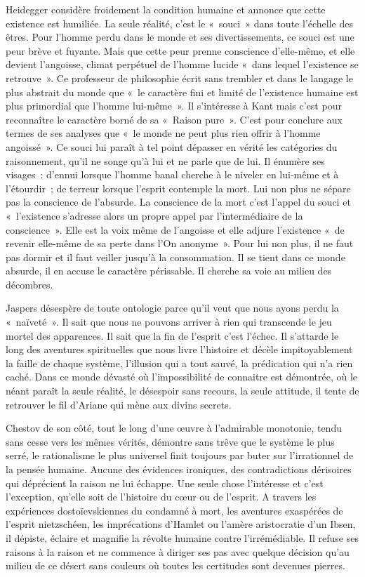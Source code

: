 \documentclass{book}
\begin{document}
Heidegger considère froidement la condition humaine et annonce que cette existence est humiliée. La seule réalité, c'est le « souci » dans toute l'échelle des êtres. Pour l'homme perdu dans le monde et ses divertissements, ce souci est une peur brève et fuyante. Mais que cette peur prenne conscience d'elle-même, et elle devient l'angoisse, climat perpétuel de l'homme lucide « dans lequel l'existence se retrouve ». Ce professeur de philosophie écrit sans trembler et dans le langage le plus abstrait du monde que « le caractère fini et limité de l'existence humaine est plus primordial que l'homme lui-même ». Il s'intéresse à Kant mais c'est pour reconnaître le caractère borné de sa « Raison pure ». C'est pour conclure aux termes de ses analyses que « le monde ne peut plus rien offrir à l'homme angoissé ». Ce souci lui paraît à tel point dépasser en vérité les catégories du raisonnement, qu'il ne songe qu'à lui et ne parle que de lui. Il énumère ses visages : d'ennui lorsque l'homme banal cherche à le niveler en lui‑même et à l'étourdir ; de terreur lorsque l'esprit contemple la mort. Lui non plus ne sépare pas la conscience de l'absurde. La conscience de la mort c'est l'appel du souci et « l'existence s'adresse alors un propre appel par l'intermédiaire de la conscience ». Elle est la voix même de l'angoisse et elle adjure l'existence « de revenir elle-même de sa perte dans l'On anonyme ». Pour lui non plus, il ne faut pas dormir et il faut veiller jusqu'à la consommation. Il se tient dans ce monde absurde, il en accuse le caractère périssable. Il cherche sa voie au milieu des décombres.

Jaspers désespère de toute ontologie parce qu'il veut que nous ayons perdu la « naïveté ». Il sait que nous ne pouvons arriver à rien qui transcende le jeu mortel des apparences. Il sait que la fin de l'esprit c'est l'échec. Il s'attarde le long des aventures spirituelles que nous livre l'histoire et décèle impitoyablement la faille de chaque système, l'illusion qui a tout sauvé, la prédication qui n'a rien caché. Dans ce monde dévasté où l'impossibilité de connaitre est démontrée, où le néant paraît la seule réalité, le désespoir sans recours, la seule attitude, il tente de retrouver le fil d'Ariane qui mène aux divins secrets.

Chestov de son côté, tout le long d'une œuvre à l'admirable monotonie, tendu sans cesse vers les mêmes vérités, démontre sans trêve que le système le plus serré, le rationalisme le plus universel finit toujours par buter sur l'irrationnel de la pensée humaine. Aucune des évidences ironiques, des contradictions dérisoires qui déprécient la raison ne lui échappe. Une seule chose l'intéresse et c'est l'exception, qu'elle soit de l'histoire du cœur ou de l'esprit. A travers les expériences dostoïevskiennes du condamné à mort, les aventures exaspérées de l'esprit nietzschéen, les imprécations d'Hamlet ou l'amère aristocratie d'un Ibsen, il dépiste, éclaire et magnifie la révolte humaine contre l'irrémédiable. Il refuse ses raisons à la raison et ne commence à diriger ses pas avec quelque décision qu'au milieu de ce désert sans couleurs où toutes les certitudes sont devenues pierres.
\end{document}
